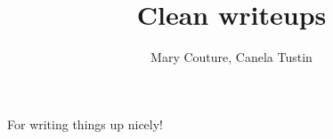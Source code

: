 \documentclass{article}
\title{Clean writeups}
\author{Mary Couture, Canela Tustin}
\begin{document}
	For writing things up nicely!
\end{document}
